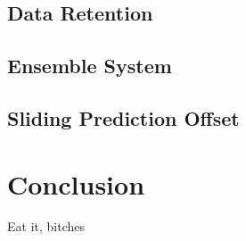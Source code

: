 \documentclass[10pt]{article}
\begin{document}
\subsection{Data Retention}


\subsection{Ensemble System}



\subsection{ Sliding Prediction Offset }


\section{Conclusion}
Eat it, bitches


\nocite{Moreno03}



\end{document}
